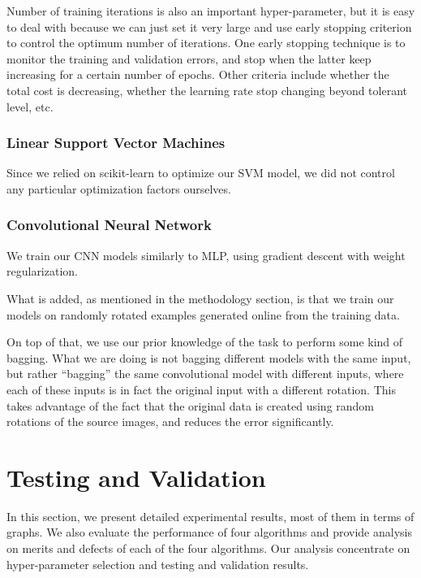 \documentclass{acm_proc_article-sp}
\begin{document}
Number of training iterations is also an important hyper-parameter, but it is easy to deal with because we can just set it very large and use early stopping criterion to control the optimum number of iterations. One early stopping technique is to monitor the training and validation errors, and stop when the latter keep increasing for a certain number of epochs. Other criteria include whether the total cost is decreasing, whether the learning rate stop changing beyond tolerant level, etc.    

\subsubsection{Linear Support Vector Machines}
Since we relied on scikit-learn \cite{scikit-learn} to optimize our SVM model, we did not control any particular optimization factors ourselves.

\subsubsection{Convolutional Neural Network}
We train our CNN models similarly to MLP, using gradient descent with weight regularization.

What is added, as mentioned in the methodology section, is that we train our models on randomly rotated examples generated online from the training data.

On top of that, we use our prior knowledge of the task to perform some kind of bagging. What we are doing is not bagging different models with the same input, but rather ``bagging'' the same convolutional model with different inputs, where each of these inputs is in fact the original input with a different rotation. This takes advantage of the fact that the original data is created using random rotations of the source images, and reduces the error significantly.






\section{Testing and Validation}
In this section, we present detailed experimental results, most of them in terms of graphs. We also evaluate the performance of four algorithms and provide analysis on merits and defects of each of the four algorithms. Our analysis concentrate on hyper-parameter selection and testing and validation results.
\end{document}
